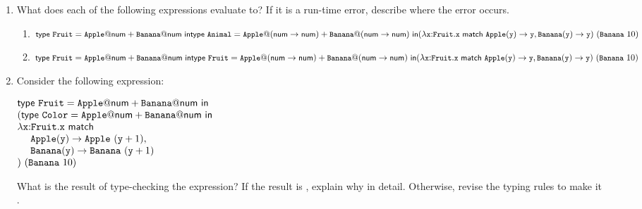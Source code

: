 \begin{enumerate}
\item What does each of the following expressions evaluate to?
If it is a run-time error, describe where the error occurs.

\begin{enumerate}
  \item
    $\small\etdef{\code{Fruit}}{\code{Apple}}{\tnum}{\code{Banana}}{\tnum}{\\
     \etdef{\code{Animal}}{\code{Apple}}{(\tarrow{\tnum}{\tnum})}{\code{Banana}}{(\tarrow{\tnum}{\tnum})}{\\
     (\efunt{\cx}{\code{Fruit}}{
       \ematch{\cx}{\code{Apple}}{\cy}{\cy}{\code{Banana}}{\cy}{\cy}
     })\ (\code{Banana}\ 10)
     }}
    $

  \item
    $\small\etdef{\code{Fruit}}{\code{Apple}}{\tnum}{\code{Banana}}{\tnum}{\\
     \etdef{\code{Fruit}}{\code{Apple}}{(\tarrow{\tnum}{\tnum})}{\code{Banana}}{(\tarrow{\tnum}{\tnum})}{\\
     (\efunt{\cx}{\code{Fruit}}{
       \ematch{\cx}{\code{Apple}}{\cy}{\cy}{\code{Banana}}{\cy}{\cy}
     })\ (\code{Banana}\ 10)
     }}
    $
\end{enumerate}

\item Consider the following expression:

$
    \begin{array}{@{}l}
      \etdef{\code{Fruit}}{\code{Apple}}{\tnum}{\code{Banana}}{\tnum}{\\
      (\etdef{\code{Color}}{\code{Apple}}{\tnum}{\code{Banana}}{\tnum}{\\
      \efunt{\cx}{\code{Fruit}}{
        \ematch{\cx}
        {\\ \ \ \ \ \code{Apple}}{\cy}{\code{Apple}\ (\cy+1)}
        {\\ \ \ \ \ \code{Banana}}{\cy}{\code{Banana}\ (\cy+1)}
      }\\
      )\ (\code{Banana}\ 10)
      }}
    \end{array}
$

What is the result of type-checking the expression?
If the result is , explain why in detail.
Otherwise, revise the typing rules to make it .


\end{enumerate}
